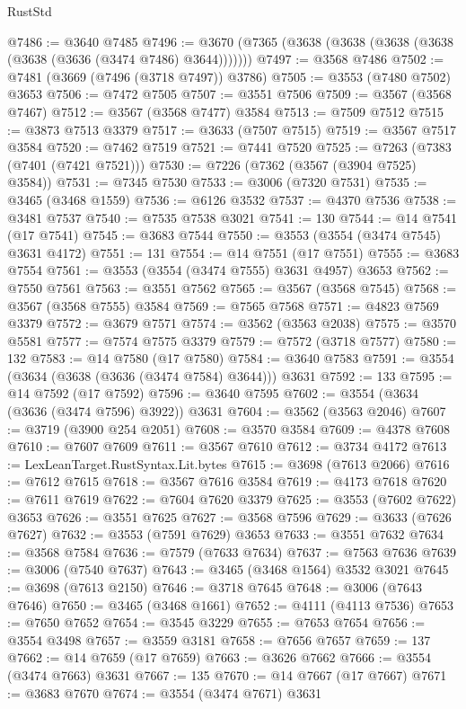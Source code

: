 \begin{lexlean}{RustStd}
\begin{coremodule}
@7486 := @3640 @7485
@7496 := @3670 (@7365 (@3638 (@3638 (@3638 (@3638 (@3638 (@3636 (@3474 @7486) @3644)))))))
@7497 := @3568 @7486
@7502 := @7481 (@3669 (@7496 (@3718 @7497)) @3786)
@7505 := @3553 (@7480 @7502) @3653
@7506 := @7472 @7505
@7507 := @3551 @7506
@7509 := @3567 (@3568 @7467)
@7512 := @3567 (@3568 @7477) @3584
@7513 := @7509 @7512
@7515 := @3873 @7513 @3379
@7517 := @3633 (@7507 @7515)
@7519 := @3567 @7517 @3584
@7520 := @7462 @7519
@7521 := @7441 @7520
@7525 := @7263 (@7383 (@7401 (@7421 @7521)))
@7530 := @7226 (@7362 (@3567 (@3904 @7525) @3584))
@7531 := @7345 @7530
@7533 := @3006 (@7320 @7531)
@7535 := @3465 (@3468 @1559)
@7536 := @6126 @3532
@7537 := @4370 @7536
@7538 := @3481 @7537
@7540 := @7535 @7538 @3021
@7541 := 130
@7544 := @14 @7541 (@17 @7541)
@7545 := @3683 @7544
@7550 := @3553 (@3554 (@3474 @7545) @3631 @4172)
@7551 := 131
@7554 := @14 @7551 (@17 @7551)
@7555 := @3683 @7554
@7561 := @3553 (@3554 (@3474 @7555) @3631 @4957) @3653
@7562 := @7550 @7561
@7563 := @3551 @7562
@7565 := @3567 (@3568 @7545)
@7568 := @3567 (@3568 @7555) @3584
@7569 := @7565 @7568
@7571 := @4823 @7569 @3379
@7572 := @3679 @7571
@7574 := @3562 (@3563 @2038)
@7575 := @3570 @5581
@7577 := @7574 @7575 @3379
@7579 := @7572 (@3718 @7577)
@7580 := 132
@7583 := @14 @7580 (@17 @7580)
@7584 := @3640 @7583
@7591 := @3554 (@3634 (@3638 (@3636 (@3474 @7584) @3644))) @3631
@7592 := 133
@7595 := @14 @7592 (@17 @7592)
@7596 := @3640 @7595
@7602 := @3554 (@3634 (@3636 (@3474 @7596) @3922)) @3631
@7604 := @3562 (@3563 @2046)
@7607 := @3719 (@3900 @254 @2051)
@7608 := @3570 @3584
@7609 := @4378 @7608
@7610 := @7607 @7609
@7611 := @3567 @7610
@7612 := @3734 @4172
@7613 := LexLeanTarget.RustSyntax.Lit.bytes
@7615 := @3698 (@7613 @2066)
@7616 := @7612 @7615
@7618 := @3567 @7616 @3584
@7619 := @4173 @7618
@7620 := @7611 @7619
@7622 := @7604 @7620 @3379
@7625 := @3553 (@7602 @7622) @3653
@7626 := @3551 @7625
@7627 := @3568 @7596
@7629 := @3633 (@7626 @7627)
@7632 := @3553 (@7591 @7629) @3653
@7633 := @3551 @7632
@7634 := @3568 @7584
@7636 := @7579 (@7633 @7634)
@7637 := @7563 @7636
@7639 := @3006 (@7540 @7637)
@7643 := @3465 (@3468 @1564) @3532 @3021
@7645 := @3698 (@7613 @2150)
@7646 := @3718 @7645
@7648 := @3006 (@7643 @7646)
@7650 := @3465 (@3468 @1661)
@7652 := @4111 (@4113 @7536)
@7653 := @7650 @7652
@7654 := @3545 @3229
@7655 := @7653 @7654
@7656 := @3554 @3498
@7657 := @3559 @3181
@7658 := @7656 @7657
@7659 := 137
@7662 := @14 @7659 (@17 @7659)
@7663 := @3626 @7662
@7666 := @3554 (@3474 @7663) @3631
@7667 := 135
@7670 := @14 @7667 (@17 @7667)
@7671 := @3683 @7670
@7674 := @3554 (@3474 @7671) @3631

\end{coremodule}
\end{lexlean}
